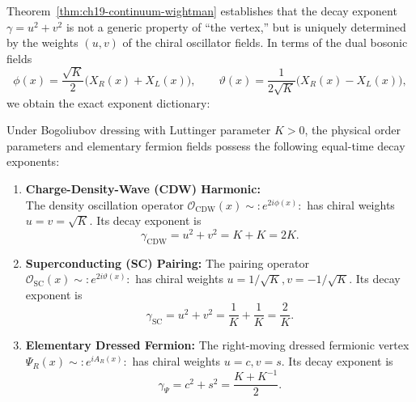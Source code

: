Theorem~\ref{thm:ch19-continuum-wightman} establishes that the decay exponent $\gamma = u^2 + v^2$
is not a generic property of ``the vertex,'' but is uniquely determined by the weights $(u, v)$
of the chiral oscillator fields.  In terms of the dual bosonic fields
\begin{equation}
 \phi(x) = \frac{\sqrt{K}}{2}\bigl(X_R(x) + X_L(x)\bigr), \qquad
 \vartheta(x) = \frac{1}{2\sqrt{K}}\bigl(X_R(x) - X_L(x)\bigr),
 \label{eq:ch19-dual-fields-def}
\end{equation}
we obtain the exact exponent dictionary:

\begin{theorem}
\label{thm:ch19-exponent-dictionary}
Under Bogoliubov dressing with Luttinger parameter $K > 0$, the physical order parameters
and elementary fermion fields possess the following equal-time decay exponents:
\begin{enumerate}
 \item \textbf{Charge-Density-Wave (CDW) Harmonic:}\\
       The density oscillation operator $\mathcal O_{\mathrm{CDW}}(x) \sim :\!e^{2i\phi(x)}\!:$ has
       chiral weights $u = v = \sqrt{K}$.  Its decay exponent is
       \begin{equation}
        \gamma_{\mathrm{CDW}} = u^2 + v^2 = K + K = 2K.
        \label{eq:ch19-cdw-exponent}
       \end{equation}
 \item \textbf{Superconducting (SC) Pairing:}
       The pairing operator $\mathcal O_{\mathrm{SC}}(x) \sim :\!e^{2i\vartheta(x)}\!:$ has
       chiral weights $u = 1/\sqrt{K}, v = -1/\sqrt{K}$.  Its decay exponent is
       \begin{equation}
        \gamma_{\mathrm{SC}} = u^2 + v^2 = \frac{1}{K} + \frac{1}{K} = \frac{2}{K}.
        \label{eq:ch19-sc-exponent}
       \end{equation}
 \item \textbf{Elementary Dressed Fermion:}
       The right-moving dressed fermionic vertex $\Psi_R(x) \sim :\!e^{i A_R(x)}\!:$ has
       chiral weights $u = c, v = s$.  Its decay exponent is
       \begin{equation}
        \gamma_{\Psi} = c^2 + s^2 = \frac{K + K^{-1}}{2}.
        \label{eq:ch19-fermion-exponent}
       \end{equation}
\end{enumerate}
\end{theorem}

